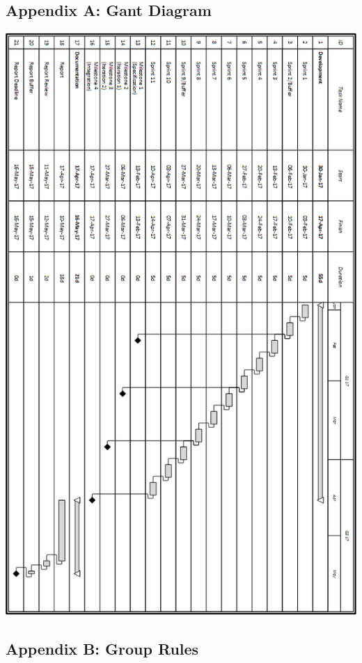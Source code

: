 \documentclass[hidelinks]{article}
\begin{document}
\subsection*{Appendix A: Gant Diagram}
\includegraphics[width=\linewidth]{gant_diagram_rotated}
\subsection*{Appendix B: Group Rules}

\end{document}
